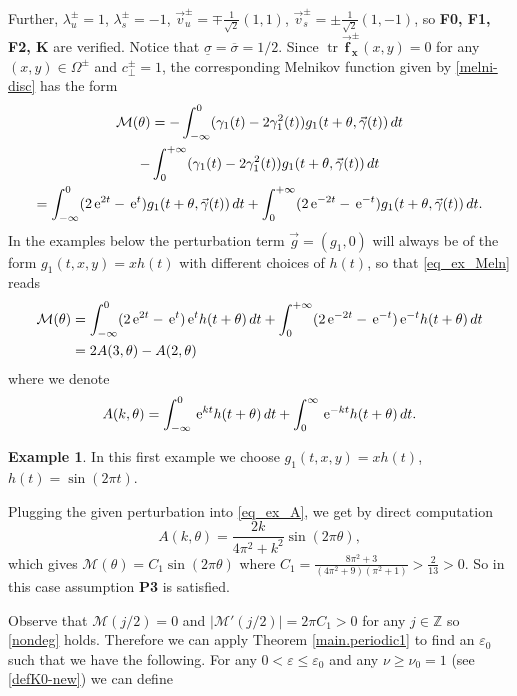 \documentclass[10pt]{article}
\numberwithin{equation}{section}
\def\eu{ {\, \textrm{\rm e} }}
\def\ga{\vec{\gamma}}
\def\ep{\varepsilon}
\def\la{\lambda}
\def\Om{\Omega}
\def\Z{{\mathbb Z}}
\def\MM{{\mathcal M}}
\def\f{\vec{f}}
\def\g{\vec{g}}
\DeclareMathOperator{\tr}{tr}
\def\und{\underline}
\def\ov{\overline}
\def\aaa{\theta}
\newcommand\assump[1]{{\rm\textbf{#1}}}
\theoremstyle{definition}
\newtheorem{example}[theorem]{Example}
\theoremstyle{remark}
\begin{document}
\noindent
Further, $\la_u^{\pm}=1$, $\la_s^{\pm}=-1$, $\vec{v}^{\pm}_u=\mp\frac{1}{\sqrt{2}}(1,1)$, $\vec{v}^{\pm}_s=\pm\frac{1}{\sqrt{2}}(1,-1)$, so
\assump{F0, F1, F2, K} are verified. Notice that $\und{\sigma}=\ov{\sigma}=1/2$.
Since $\tr\boldsymbol{\f_x^\pm}(x,y)=0$ for any $(x,y)\in\Om^\pm$ and $c_{\perp}^{\pm}=1$, the corresponding Melnikov function given by \eqref{melni-disc} has the form
\begin{equation}\label{eq_ex_Meln}
	\begin{gathered}
		\mathcal{M}(\aaa)= -\int_{-\infty}^{0}  (\gamma_1(t)-2\gamma_1^2(t))g_1(t+\aaa,\ga(t))\,dt\\
		-\int_{0}^{+\infty} (\gamma_1(t)-2\gamma_1^2(t))g_1(t+\aaa,\ga(t))\,dt\\
		=\int_{-\infty}^{0} (2\eu^{2t}-\eu^t)g_1(t+\aaa,\ga(t))\,dt
		+\int_{0}^{+\infty} (2\eu^{-2t}-\eu^{-t})g_1(t+\aaa,\ga(t))\,dt.
	\end{gathered}
\end{equation}
%
In the examples below the perturbation term  $\g= (g_1,0)$ will always be of the form $g_1(t,x,y)=xh(t)$ with different choices of $h(t)$, so
that \eqref{eq_ex_Meln} reads
\begin{equation}\label{eq_ex_M}
\begin{split}
	\mathcal{M}(\aaa)&=\int_{-\infty}^{0} (2\eu^{2t}-\eu^t)\eu^{t}h(t+\aaa)\,dt
	+\int_{0}^{+\infty} (2\eu^{-2t}-\eu^{-t})\eu^{-t}h(t+\aaa)\,dt\\
	&=2A(3,\aaa)-A(2,\aaa)
\end{split}
\end{equation}
where we denote
\begin{equation}\label{eq_ex_A}
	A(k, \aaa)=\int_{-\infty}^0\eu^{kt}h(t+\aaa)\,dt+\int_0^\infty \eu^{-kt}h(t+\aaa)\,dt.
\end{equation}


\begin{example}\label{ex1}
In this first example we choose $g_1(t,x,y)=xh(t)$, $h(t)=\sin (2\pi t)$.
\end{example}


 Plugging the given perturbation into \eqref{eq_ex_A}, we get
by direct computation
\[
A(k,\aaa)=\frac{2 k}{4 \pi^2+k^2}\sin(2 \pi\aaa),
\] which gives
$\mathcal{M}(\aaa)=C_1 \sin (2 \pi\aaa)$ where $C_1=\frac{ 8\pi^2+3}{(4\pi^2+9)(\pi^2+1)}>\frac{2}{13}>0$. So in this case assumption
\assump{P3} is satisfied.





Observe that $\MM(j/2)=0$ and $|\MM'(j/2)|= 2 \pi C_1>0$ for any $j \in \Z$ so \eqref{nondeg} holds.
Therefore we can apply Theorem \ref{main.periodic1} to find an $\ep_0$ such that we have the following.
For any $0<\ep \le \ep_0$ and any $\nu \ge \nu_0=1$ (see \eqref{defK0-new}) we can define
\end{document}
